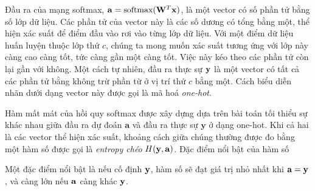 \def\softmax{\text{softmax}}
Đầu ra của mạng softmax, $\ba = \softmax(\bW^T\bx)$, là một vector có số phần tử bằng số lớp dữ liệu. Các phần tử của vector này là các số dương có tổng bằng một, thể hiện xác suất để điểm đầu vào rơi vào từng lớp dữ liệu. Với một điểm dữ liệu huấn luyện thuộc lớp thứ $c$, chúng ta mong muốn xác suất tương ứng với lớp này càng cao càng tốt, tức càng gần một càng tốt. Việc này kéo theo các phần tử còn lại gần với không. Một cách tự nhiên, đầu ra thực sự $\mathbf{y}$ là một vector có tất cả các phần tử bằng không trừ phần từ ở vị trí thứ $c$ bằng một. Cách biểu diễn nhãn dưới dạng vector này được gọi là mã hoá \textit{one-hot}.


Hàm mất mát của hồi quy softmax được xây dựng dựa trên bài toán tối thiểu sự
khác nhau giữa {đầu ra dự đoán} $\mathbf{a}$ và {đầu ra thực sự}
$\mathbf{y}$ ở dạng one-hot. Khi cả hai là các vector thể hiện xác suất,
khoảng cách giữa chúng thường được đo bằng một hàm số được gọi là
\textit{entropy chéo} $H(\mathbf{y}, \mathbf{a})$. Đặc điểm nổi bật của hàm số

Một đặc điểm nổi bật là nếu cố định $\mathbf{y}$, hàm số sẽ đạt giá trị nhỏ nhất khi $\mathbf{a} = \mathbf{y}$, và càng lớn nếu $\mathbf{a}$ càng khác $\mathbf{y}$.



